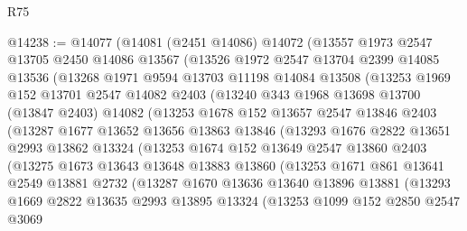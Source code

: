 \begin{lexlean}{R75}
\begin{coremodule}
@14238 := @14077
    (@14081
      (@2451 @14086)
      @14072
      (@13557
        @1973
        @2547
        @13705
        @2450
        @14086
        @13567
        (@13526
          @1972
          @2547
          @13704
          @2399
          @14085
          @13536
          (@13268
            @1971
            @9594
            @13703
            @11198
            @14084
            @13508
            (@13253
              @1969
              @152
              @13701
              @2547
              @14082
              @2403
              (@13240
                @343
                @1968
                @13698
                @13700
                (@13847 @2403)
                @14082
                (@13253
                  @1678
                  @152
                  @13657
                  @2547
                  @13846
                  @2403
                  (@13287
                    @1677
                    @13652
                    @13656
                    @13863
                    @13846
                    (@13293
                      @1676
                      @2822
                      @13651
                      @2993
                      @13862
                      @13324
                      (@13253
                        @1674
                        @152
                        @13649
                        @2547
                        @13860
                        @2403
                        (@13275
                          @1673
                          @13643
                          @13648
                          @13883
                          @13860
                          (@13253
                            @1671
                            @861
                            @13641
                            @2549
                            @13881
                            @2732
                            (@13287
                              @1670
                              @13636
                              @13640
                              @13896
                              @13881
                              (@13293
                                @1669
                                @2822
                                @13635
                                @2993
                                @13895
                                @13324
                                (@13253
                                  @1099
                                  @152
                                  @2850
                                  @2547
                                  @3069

\end{coremodule}
\end{lexlean}

